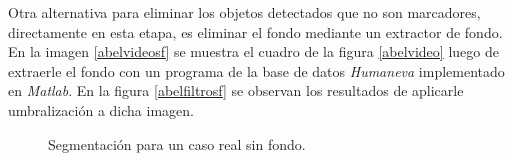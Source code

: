 Otra alternativa para eliminar los objetos detectados que no son marcadores, directamente en esta etapa, es eliminar el fondo mediante un extractor de fondo. En la imagen \ref{abelvideosf} se muestra el cuadro de la figura \ref{abelvideo} luego de extraerle el fondo con un programa de la base de datos \emph{Humaneva}\cite{humanevaBase} implementado en \emph{Matlab}. En la figura \ref{abelfiltrosf} se observan los resultados de aplicarle umbralización a dicha imagen.

\begin{figure}[H]
        \centering
        \hspace{5 mm}
  \caption{Segmentación para un caso real sin fondo.}
      \label{ejemploabelsf}
\end{figure}

